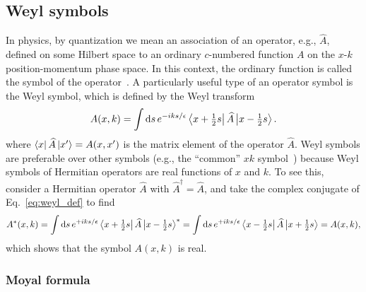 \begin{subappendices}

\section{Weyl symbols}
\label{sec:weyl}

In physics, by quantization we mean an association of an operator, e.g., $\widehat{A}$, defined on some Hilbert space to an ordinary $c$-numbered function $A$ on the $x$-$k$ position-momentum phase space.
In this context, the ordinary function is called the symbol of the operator~\cite[\S 2.3.1]{chaichian2001}.
A particularly useful type of an operator symbol is the Weyl symbol, which is defined by the Weyl transform
%
\begin{equation}
  A(x, k) = \int \mathrm{d}{s}\, e^{-iks/\epsilon} \left\langle x + \tfrac{1}{2}s\right|\widehat{A}\left|x - \tfrac{1}{2}s\right\rangle.
  \label{eq:weyl_def}
\end{equation}
%
where $\mathinner{\langle{x}\rvert}\widehat{A}\mathinner{\lvert{x'}\rangle} = A(x, x')$ is the matrix element of the operator $\widehat{A}$.
Weyl symbols are preferable over other symbols (e.g., the ``common'' $xk$ symbol~\cite{mcdonald1988}) because Weyl symbols of Hermitian operators are real functions of $x$ and $k$.
To see this, consider a Hermitian operator $\widehat{A}$ with $\widehat{A}^{\dagger} = \widehat{A}$, and take the complex conjugate of Eq.~\eqref{eq:weyl_def} to find
%
\begin{equation}
  A^{*}(x, k) = \int \mathrm{d}{s}\, e^{+iks/\epsilon} \left\langle x + \tfrac{1}{2}s\right|\widehat{A}\left|x - \tfrac{1}{2}s\right\rangle^{*}
  = \int \mathrm{d}{s}\, e^{+iks/\epsilon} \left\langle x - \tfrac{1}{2}s\right|\widehat{A}\left|x + \tfrac{1}{2}s\right\rangle = A(x, k),
  \label{eq:weylsym}
\end{equation}
%
which shows that the symbol $A(x, k)$ is real.

\squeezepage[0.5]

\subsubsection*{Moyal formula}


\end{subappendices}
